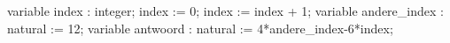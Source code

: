 variable index : integer;
index := 0;
index := index + 1;
variable andere_index : natural := 12;
variable antwoord : natural := 4*andere_index-6*index;
